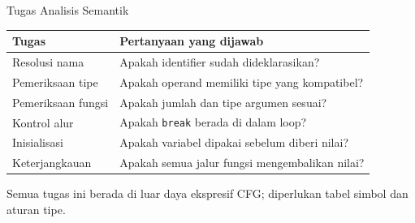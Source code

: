 \documentclass[aspectratio=169,10pt,t]{beamer}
\begin{document}
\begin{frame}{Tugas Analisis Semantik}
  \scriptsize
  \setlength{\tabcolsep}{4pt}
  \begin{tabular}{@{}p{4.0cm}p{9.2cm}@{}}
    \toprule
    \textbf{Tugas} & \textbf{Pertanyaan yang dijawab} \\
    \midrule
    Resolusi nama & Apakah identifier sudah dideklarasikan? \\
    Pemeriksaan tipe & Apakah operand memiliki tipe yang kompatibel? \\
    Pemeriksaan fungsi & Apakah jumlah dan tipe argumen sesuai? \\
    Kontrol alur & Apakah \texttt{break} berada di dalam loop? \\
    Inisialisasi & Apakah variabel dipakai sebelum diberi nilai? \\
    Keterjangkauan & Apakah semua jalur fungsi mengembalikan nilai? \\
    \bottomrule
  \end{tabular}

  \vspace{5pt}
  {\scriptsize\color{ubbblue!75}Semua tugas ini berada di luar daya
  ekspresif CFG; diperlukan tabel simbol dan aturan tipe.}
\end{frame}
\end{document}
